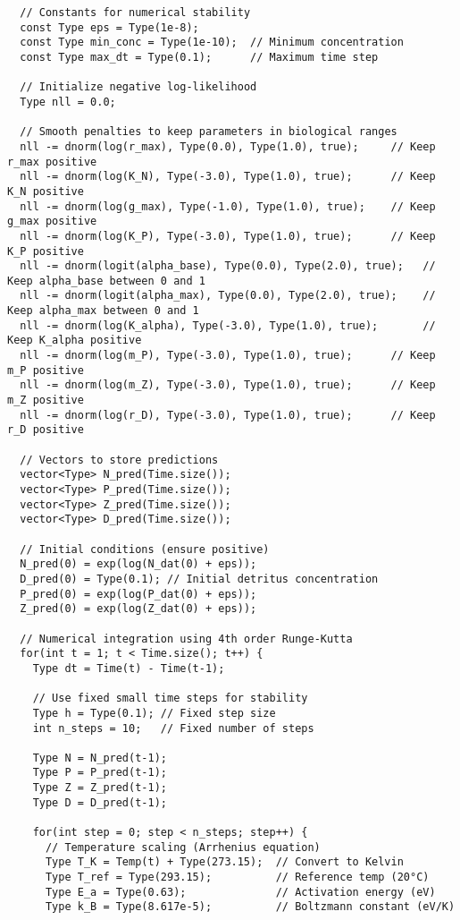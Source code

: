 \begin{lstlisting}
  // Constants for numerical stability
  const Type eps = Type(1e-8);
  const Type min_conc = Type(1e-10);  // Minimum concentration
  const Type max_dt = Type(0.1);      // Maximum time step
  
  // Initialize negative log-likelihood
  Type nll = 0.0;
  
  // Smooth penalties to keep parameters in biological ranges
  nll -= dnorm(log(r_max), Type(0.0), Type(1.0), true);     // Keep r_max positive
  nll -= dnorm(log(K_N), Type(-3.0), Type(1.0), true);      // Keep K_N positive
  nll -= dnorm(log(g_max), Type(-1.0), Type(1.0), true);    // Keep g_max positive
  nll -= dnorm(log(K_P), Type(-3.0), Type(1.0), true);      // Keep K_P positive
  nll -= dnorm(logit(alpha_base), Type(0.0), Type(2.0), true);   // Keep alpha_base between 0 and 1
  nll -= dnorm(logit(alpha_max), Type(0.0), Type(2.0), true);    // Keep alpha_max between 0 and 1
  nll -= dnorm(log(K_alpha), Type(-3.0), Type(1.0), true);       // Keep K_alpha positive
  nll -= dnorm(log(m_P), Type(-3.0), Type(1.0), true);      // Keep m_P positive
  nll -= dnorm(log(m_Z), Type(-3.0), Type(1.0), true);      // Keep m_Z positive
  nll -= dnorm(log(r_D), Type(-3.0), Type(1.0), true);      // Keep r_D positive
  
  // Vectors to store predictions
  vector<Type> N_pred(Time.size());
  vector<Type> P_pred(Time.size());
  vector<Type> Z_pred(Time.size());
  vector<Type> D_pred(Time.size());
  
  // Initial conditions (ensure positive)
  N_pred(0) = exp(log(N_dat(0) + eps));
  D_pred(0) = Type(0.1); // Initial detritus concentration
  P_pred(0) = exp(log(P_dat(0) + eps));
  Z_pred(0) = exp(log(Z_dat(0) + eps));
  
  // Numerical integration using 4th order Runge-Kutta
  for(int t = 1; t < Time.size(); t++) {
    Type dt = Time(t) - Time(t-1);
    
    // Use fixed small time steps for stability
    Type h = Type(0.1); // Fixed step size
    int n_steps = 10;   // Fixed number of steps
    
    Type N = N_pred(t-1);
    Type P = P_pred(t-1);
    Type Z = Z_pred(t-1);
    Type D = D_pred(t-1);
    
    for(int step = 0; step < n_steps; step++) {
      // Temperature scaling (Arrhenius equation)
      Type T_K = Temp(t) + Type(273.15);  // Convert to Kelvin
      Type T_ref = Type(293.15);          // Reference temp (20°C)
      Type E_a = Type(0.63);              // Activation energy (eV)
      Type k_B = Type(8.617e-5);          // Boltzmann constant (eV/K)
      

\end{lstlisting}
